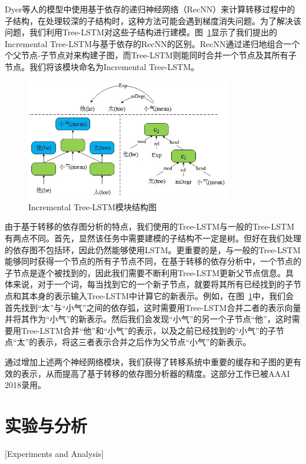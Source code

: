 Dyer等人的模型中使用基于依存的递归神经网络（RecNN）\cite{socher2011parsing}来计算转移过程中的子结构，在处理较深的子结构时，这种方法可能会遇到梯度消失问题。为了解决该问题，我们利用Tree-LSTM\cite{tai-socher-manning:2015:ACL-IJCNLP}对这些子结构进行建模。图~\ref{fig:it}显示了我们提出的Incremental Tree-LSTM与基于依存的RecNN的区别。RecNN通过递归地组合一个个父节点-子节点对来构建子图，而Tree-LSTM则能同时合并一个节点及其所有子节点。我们将该模块命名为Incremental Tree-LSTM。

\begin{figure}[hbtp]
	\centering
	\includegraphics[width=0.8\textwidth]{figures/it.jpg}
	\caption{Incremental Tree-LSTM模块结构图}
	\label{fig:it}
\end{figure}

由于基于转移的依存图分析的特点，我们使用的Tree-LSTM与一般的Tree-LSTM有两点不同。首先，显然该任务中需要建模的子结构不一定是树。但好在我们处理的依存图不包括环，因此仍然能够使用LSTM。更重要的是，与一般的Tree-LSTM能够同时获得一个节点的所有子节点不同，在基于转移的依存分析中，一个节点的子节点是逐个被找到的，因此我们需要不断利用Tree-LSTM更新父节点信息。具体来说，对于一个词，每当找到它的一个新子节点，就要将其所有已经找到的子节点和其本身的表示输入Tree-LSTM中计算它的新表示。例如，在图~\ref{fig:it}中，我们会首先找到“太”与“小气”之间的依存弧，这时需要用Tree-LSTM合并二者的表示向量并将其作为“小气”的新表示。然后我们会发现“小气”的另一个子节点“他”，这时需要用Tree-LSTM合并“他”和“小气”的表示，以及之前已经找到的“小气”的子节点“太”的表示，将这三者表示合并之后作为父节点“小气”的新表示。

通过增加上述两个神经网络模块，我们获得了转移系统中重要的缓存和子图的更有效的表示，从而提高了基于转移的依存图分析器的精度。这部分工作已被AAAI 2018录用。


\section{实验与分析}[Experiments and Analysis]

